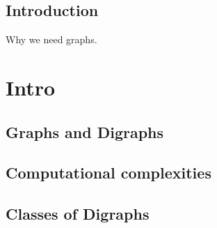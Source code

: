 \section{Introduction}
Why we need graphs.
\chapter{Intro}
\section*{Graphs and Digraphs}

\section{Computational complexities}

\section{Classes of Digraphs}


